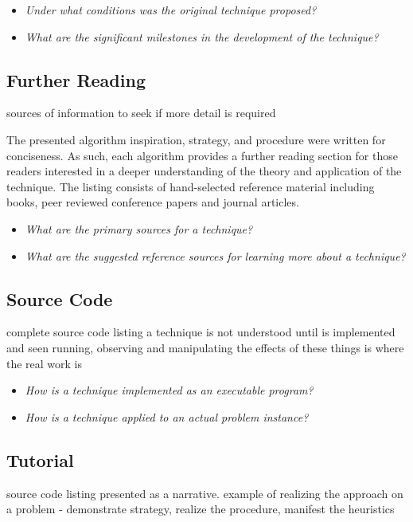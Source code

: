 \documentclass[a4paper, 11pt]{article}
\begin{document}
\begin{itemize}
	\item \emph{Under what conditions was the original technique proposed?}
	\item \emph{What are the significant milestones in the development of the technique?}
\end{itemize}

\subsection{Further Reading}
sources of information to seek if more detail is required

The presented algorithm inspiration, strategy, and procedure were written for conciseness. As such, each algorithm provides a further reading section for those readers interested in a deeper understanding of the theory and application of the technique. The listing consists of hand-selected reference material including books, peer reviewed conference papers and journal articles.

\begin{itemize}
	\item \emph{What are the primary sources for a technique?}
	\item \emph{What are the suggested reference sources for learning more about a technique?}
\end{itemize}

\subsection{Source Code}
complete source code listing
a technique is not understood until is implemented and seen running, observing and manipulating the effects of these things is where the real work is 

\begin{itemize}
	\item \emph{How is a technique implemented as an executable program?}
	\item \emph{How is a technique applied to an actual problem instance?}
\end{itemize}

\subsection{Tutorial}
source code listing presented as a narrative. example of realizing the approach on a problem - demonstrate strategy, realize the procedure, manifest the heuristics
\end{document}
